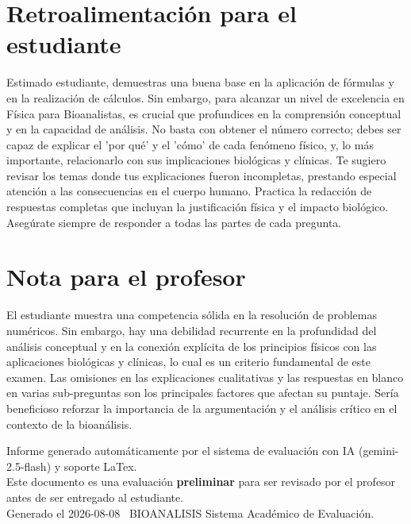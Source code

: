 \documentclass[11pt,a4paper]{article}
\begin{document}
\section*{Retroalimentación para el estudiante}
\begin{tcolorbox}[cajaRecomendacion, title={Dirigido a: Maria Melendez}]
Estimado estudiante, demuestras una buena base en la aplicación de fórmulas y en la realización de cálculos. Sin embargo, para alcanzar un nivel de excelencia en Física para Bioanalistas, es crucial que profundices en la comprensión conceptual y en la capacidad de análisis. No basta con obtener el número correcto; debes ser capaz de explicar el 'por qué' y el 'cómo' de cada fenómeno físico, y, lo más importante, relacionarlo con sus implicaciones biológicas y clínicas. Te sugiero revisar los temas donde tus explicaciones fueron incompletas, prestando especial atención a las consecuencias en el cuerpo humano. Practica la redacción de respuestas completas que incluyan la justificación física y el impacto biológico. Asegúrate siempre de responder a todas las partes de cada pregunta.
\end{tcolorbox}

\section*{Nota para el profesor}
\begin{tcolorbox}[
  enhanced, breakable,
  colback=yellow!8, colframe=yellow!60!black,
  fonttitle=\bfseries, coltitle=black,
  title={Observaciones para revisión manual},
  top=4pt, bottom=4pt, left=8pt, right=8pt,
]
El estudiante muestra una competencia sólida en la resolución de problemas numéricos. Sin embargo, hay una debilidad recurrente en la profundidad del análisis conceptual y en la conexión explícita de los principios físicos con las aplicaciones biológicas y clínicas, lo cual es un criterio fundamental de este examen. Las omisiones en las explicaciones cualitativas y las respuestas en blanco en varias sub-preguntas son los principales factores que afectan su puntaje. Sería beneficioso reforzar la importancia de la argumentación y el análisis crítico en el contexto de la bioanálisis.
\end{tcolorbox}

\vspace{12pt}
\begin{center}
  \footnotesize\color{gray}
  Informe generado automáticamente por el sistema de evaluación con IA (gemini-2.5-flash) y soporte LaTex. \\
  Este documento es una evaluación \textbf{preliminar} para ser revisado por el profesor antes de ser entregado al 
  estudiante. \\
  Generado el 2026-08-08 \textbullet\ BIOANALISIS Sistema Académico de Evaluación.
  \end{center}
\end{document}
